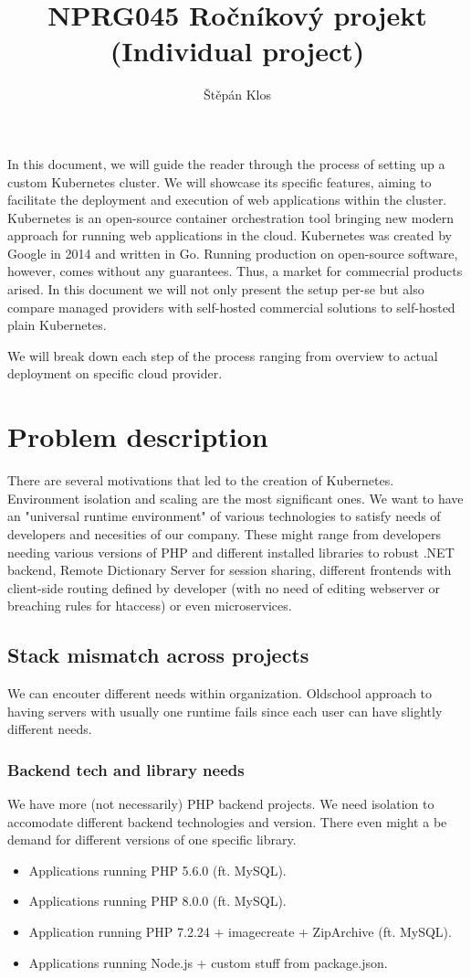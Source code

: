 \documentclass{article}
\title{NPRG045 Ročníkový projekt (Individual project)}
\author{Štěpán Klos}
\date{}
\begin{document}
\maketitle

In this document, we will guide the reader through the process of setting up a custom Kubernetes cluster. We will showcase its specific features, aiming to facilitate the deployment and execution of web applications within the cluster.
\bigbreak
Kubernetes is an open-source container orchestration tool bringing new modern approach for running web applications in the cloud. Kubernetes was created by Google in 2014 and written in Go. Running production on open-source software, however, comes without any guarantees. Thus, a market for commecrial products arised. In this document we will not only present the setup per-se but also compare managed providers with self-hosted commercial solutions to self-hosted plain Kubernetes. \par
\bigbreak
We will break down each step of the process ranging from overview to actual deployment on specific cloud provider.   

\section{Problem description}
There are several motivations that led to the creation of Kubernetes. Environment isolation and scaling are the most significant ones. We want to have an "universal runtime environment" of various technologies to satisfy needs of developers and necesities of our company. These might range from developers needing various versions of PHP and different installed libraries to robust .NET backend, Remote Dictionary Server for session sharing, different frontends with client-side routing defined by developer (with no need of editing webserver or breaching rules for htaccess) or even microservices. 
\subsection{Stack mismatch across projects}
We can encouter different needs within organization. Oldschool approach to having servers with usually one runtime fails since each user can have slightly different needs.
\subsubsection{Backend tech and library needs}
We have more (not necessarily) PHP backend projects. We need isolation to accomodate different backend technologies and version. There even might a be demand for different versions of one specific library.
\begin{itemize}
  \item Applications running PHP 5.6.0 (ft. MySQL).
  \item Applications running PHP 8.0.0 (ft. MySQL).
  \item Application running PHP 7.2.24 + imagecreate + ZipArchive (ft. MySQL).
  \item Applications running Node.js + custom stuff from package.json.
\end{itemize}
\end{document}
